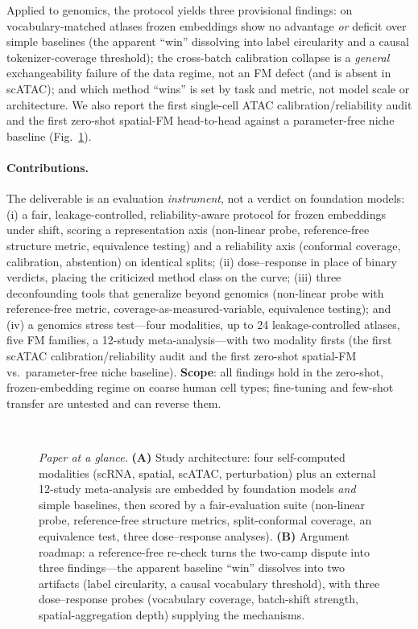 \documentclass[journal]{IEEEtran}
\begin{document}
Applied to genomics, the protocol yields three provisional findings: on vocabulary-matched atlases frozen embeddings show no advantage \emph{or} deficit over simple baselines (the apparent ``win'' dissolving into label circularity and a causal tokenizer-coverage threshold); the cross-batch calibration collapse is a \emph{general} exchangeability failure of the data regime, not an FM defect (and is absent in scATAC); and which method ``wins'' is set by task and metric, not model scale or architecture. We also report the first single-cell ATAC calibration/reliability audit and the first zero-shot spatial-FM head-to-head against a parameter-free niche baseline (Fig.~\ref{fig:schematic}).

\paragraph{Contributions.} The deliverable is an evaluation \emph{instrument}, not a verdict on foundation models: (i) a fair, leakage-controlled, reliability-aware protocol for frozen embeddings under shift, scoring a representation axis (non-linear probe, reference-free structure metric, equivalence testing) and a reliability axis (conformal coverage, calibration, abstention) on identical splits; (ii) dose--response in place of binary verdicts, placing the criticized method class on the curve; (iii) three deconfounding tools that generalize beyond genomics (non-linear probe with reference-free metric, coverage-as-measured-variable, equivalence testing); and (iv) a genomics stress test---four modalities, up to 24 leakage-controlled atlases, five FM families, a 12-study meta-analysis---with two modality firsts (the first scATAC calibration/reliability audit and the first zero-shot spatial-FM vs.\ parameter-free niche baseline). \textbf{Scope}: all findings hold in the zero-shot, frozen-embedding regime on coarse human cell types; fine-tuning and few-shot transfer are untested and can reverse them.

\begin{figure}[!tbp]\centering
\resizebox{0.86\textwidth}{!}{}\\[1pt]
\resizebox{0.86\textwidth}{!}{}
\caption{\emph{Paper at a glance.} \textbf{(A)} Study architecture: four self-computed modalities (scRNA, spatial, scATAC, perturbation) plus an external 12-study meta-analysis are embedded by foundation models \emph{and} simple baselines, then scored by a fair-evaluation suite (non-linear probe, reference-free structure metrics, split-conformal coverage, an equivalence test, three dose--response analyses). \textbf{(B)} Argument roadmap: a reference-free re-check turns the two-camp dispute into three findings---the apparent baseline ``win'' dissolves into two artifacts (label circularity, a causal vocabulary threshold), with three dose--response probes (vocabulary coverage, batch-shift strength, spatial-aggregation depth) supplying the mechanisms.}\label{fig:schematic}\end{figure}
\end{document}

